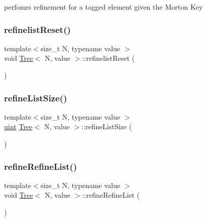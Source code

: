 perfomrs refinement for a tagged element given the Morton Key \mbox{\label{classTree_aa07840353d0eb24fe3af3ddf348f3378}} 
\subsubsection{\texorpdfstring{refinelist\+Reset()}{refinelistReset()}}
{\footnotesize\ttfamily template$<$size\+\_\+t N, typename value $>$ \\
void \mbox{\hyperlink{classTree}{Tree}}$<$ N, value $>$\+::refinelist\+Reset (\begin{DoxyParamCaption}{ }\end{DoxyParamCaption})}

\mbox{\label{classTree_a214243106c17c81d193834cfeb7dfd85}} 
\subsubsection{\texorpdfstring{refine\+List\+Size()}{refineListSize()}}
{\footnotesize\ttfamily template$<$size\+\_\+t N, typename value $>$ \\
\mbox{\hyperlink{definitions_8h_a69aa29b598b851b0640aa225a9e5d61d}{uint}} \mbox{\hyperlink{classTree}{Tree}}$<$ N, value $>$\+::refine\+List\+Size (\begin{DoxyParamCaption}{ }\end{DoxyParamCaption})}

\mbox{\label{classTree_a4b8830fdf12cdd981a853937b6289816}} 
\subsubsection{\texorpdfstring{refine\+Refine\+List()}{refineRefineList()}\hspace{0.1cm}{\footnotesize\ttfamily [1/3]}}
{\footnotesize\ttfamily template$<$size\+\_\+t N, typename value $>$ \\
void \mbox{\hyperlink{classTree}{Tree}}$<$ N, value $>$\+::refine\+Refine\+List (\begin{DoxyParamCaption}{ }\end{DoxyParamCaption})}

